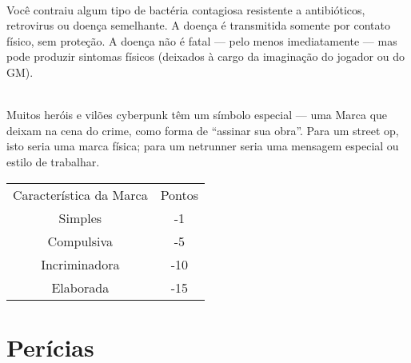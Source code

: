 \documentclass[a4paper]{article}
\begin{document}
\begin{description}
\begin{table}[h]
{\begin{tabular}{ l l }
 \end{tabular} }
\end{table}

    \item[Doença Contagiosa - -5 Pontos] \hfill \\ Você contraiu algum tipo de bactéria contagiosa resistente a
antibióticos, retrovirus ou doença semelhante. A doença é transmitida
somente por contato físico, sem proteção. A doença não é fatal — pelo menos
imediatamente — mas pode produzir sintomas físicos (deixados à
cargo da imaginação do jogador ou do GM).

    \item[Marca - -1 a -15 Pontos] \hfill \\ Muitos heróis e vilões cyberpunk têm um símbolo especial
— uma Marca que deixam na cena do crime, como forma de
“assinar sua obra”. Para um street op, isto seria uma marca física;
para um netrunner seria uma mensagem especial ou estilo de
trabalhar.

\begin{table}[h]
 \centering
 {\renewcommand\arraystretch{1.25}
 \begin{tabular}{ l l }
  \cline{1-1}\cline{2-2}  
    \multicolumn{1}{|c|}{Característica da Marca \centering } &
    \multicolumn{1}{c|}{Pontos \centering }
  \\  
  \cline{1-1}\cline{2-2}  
    \multicolumn{1}{|c|}{Simples \centering } &
    \multicolumn{1}{c|}{-1 \centering }
  \\  
  \cline{1-1}\cline{2-2}  
    \multicolumn{1}{|c|}{Compulsiva \centering } &
    \multicolumn{1}{c|}{-5 \centering }
  \\  
  \cline{1-1}\cline{2-2}  
    \multicolumn{1}{|c|}{Incriminadora \centering } &
    \multicolumn{1}{c|}{-10 \centering }
  \\  
  \cline{1-1}\cline{2-2}  
    \multicolumn{1}{|c|}{Elaborada \centering } &
    \multicolumn{1}{c|}{-15 \centering }
  \\  
  \hline
 \end{tabular} }
\end{table}



\section{Perícias}


\end{description}
\end{document}
